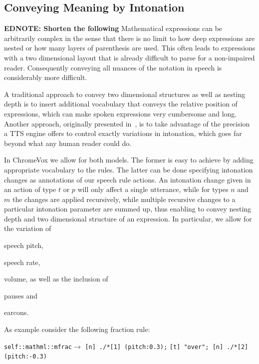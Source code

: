 \documentclass{sig-alternate}
\newcommand\ednote[1]{\typeout{There is still a note!!!}%
  {\bf EDNOTE: #1}}
\begin{document}
\subsection{Conveying Meaning by Intonation}

\ednote{Shorten the following}
Mathematical expressions can be arbitrarily complex in the sense that there is
no limit to how deep expressions are nested or how many layers of parenthesis
are used. This often leads to expressions with a two dimensional layout that is
already difficult to parse for a non-impaired reader. Consequently conveying all
nuances of the notation in speech is considerably more difficult.

A traditional approach to convey two dimensional structures as well as nesting
depth is to insert additional vocabulary that conveys the relative position of
expressions, which can make spoken expressions very cumbersome and long.
Another approach, originally presented in~\cite{raman1994aster}, is to take
advantage of the precision a TTS engine offers to control exactly variations in
intonation, which goes far beyond what any human reader could do.

In ChromeVox we allow for both models. The former is easy to achieve by adding
appropriate vocabulary to the rules. The latter can be done specifying
intonation changes as annotations of our speech rule actions. An intonation
change given in an action of type $t$ or $p$ will only affect a single
utterance, while for types $n$ and $m$ the changes are applied recursively,
while multiple recursive changes to a particular intonation parameter are summed
up, thus enabling to convey nesting depth and two dimensional structure of an
expression.  In particular, we allow for the variation of
\begin{inparaenum}[(1)]
\item speech pitch,
\item speech rate,
\item volume, as well as the inclusion of
\item pauses and
\item earcons.
\end{inparaenum}

As example consider the following fraction rule:

\noindent\texttt{self::mathml::mfrac}$\longrightarrow$
\texttt{[n] ./*[1] (pitch:0.3);}\newline
\hspace*{\fill}\texttt{[t] "over"; [n] ./*[2] (pitch:-0.3)}
\end{document}

